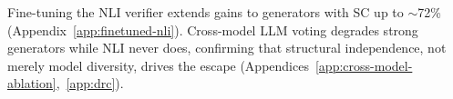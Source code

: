 \begin{table}[t]
\centering
\small
\caption{Cross-generator NLI escape with DeBERTa-large-mnli verifier (55.00\% standalone, ProofWriter $n{=}600$). Combo gain decreases monotonically with generator capability.}
\label{tab:cross_generator_nli}
\end{table}

 Fine-tuning the NLI verifier extends gains to generators with SC up to ${\sim}$72\% (Appendix~\ref{app:finetuned-nli}). Cross-model LLM voting degrades strong generators while NLI never does, confirming that structural independence, not merely model diversity, drives the escape (Appendices~\ref{app:cross-model-ablation},~\ref{app:drc}).
